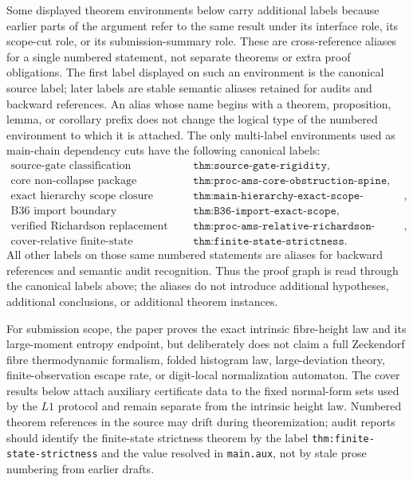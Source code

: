 Some displayed theorem environments below carry additional labels because earlier
parts of the argument refer to the same result under its interface role, its
scope-cut role, or its submission-summary role.  These are cross-reference
aliases for a single numbered statement, not separate theorems or extra proof
obligations.  The first label displayed on such an environment is the canonical
source label; later labels are stable semantic aliases retained for audits and
backward references.  An alias whose name begins with a theorem, proposition,
lemma, or corollary prefix does not change the logical type of the numbered
environment to which it is attached.  The only multi-label environments used as
main-chain dependency cuts have the following canonical labels:
\[
\begin{array}{ll}
\text{source-gate classification} & \texttt{thm:source-gate-rigidity},\\
\text{core non-collapse package} & \texttt{thm:proc-ams-core-obstruction-spine},\\
\text{exact hierarchy scope closure} & \texttt{thm:main-hierarchy-exact-scope-closure},\\
\text{B36 import boundary} & \texttt{thm:B36-import-exact-scope},\\
\text{verified Richardson replacement spine} & \texttt{thm:proc-ams-relative-richardson-theorem},\\
\text{cover-relative finite-state obstruction} & \texttt{thm:finite-state-strictness}.
\end{array}
\]
All other labels on those same numbered statements are aliases for backward
references and semantic audit recognition.  Thus the proof graph is read through
the canonical labels above; the aliases do not introduce additional hypotheses,
additional conclusions, or additional theorem instances.

For submission scope, the paper proves the exact intrinsic fibre-height law and
its large-moment entropy endpoint, but deliberately does not claim a full
Zeckendorf fibre thermodynamic formalism, folded histogram law, large-deviation
theory, finite-observation escape rate, or digit-local normalization automaton.
The cover results below attach auxiliary certificate data to the fixed normal-form
sets used by the \(L1\) protocol and remain separate from the intrinsic height law.
Numbered theorem references in the source may drift during theoremization; audit
reports should identify the finite-state strictness theorem by the label
\texttt{thm:finite-state-strictness} and the value resolved in \texttt{main.aux},
not by stale prose numbering from earlier drafts.


